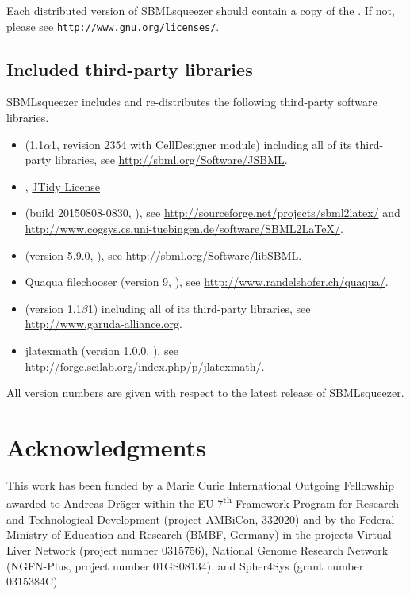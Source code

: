 Each distributed version of SBMLsqueezer should contain a copy of the 
. If not, please see
\href{http://www.gnu.org/licenses/gpl-3.0-standalone.html}{\nolinkurl{http://www.gnu.org/licenses/}}.


\section{Included third-party libraries}
SBMLsqueezer includes and re-distributes the following third-party software libraries.
\begin{itemize}
  \item \JSBML (1.1$\alpha$1, revision 2354 with CellDesigner module) including all of its third-party libraries, see \url{http://sbml.org/Software/JSBML}.
  \item {}, \href{http://jtidy.sourceforge.net/multiproject/jtidyservlet/license.html}{JTidy License}
  \item \SBMLLaTeX (build 20150808-0830, \GPL), see \url{http://sourceforge.net/projects/sbml2latex/} and \url{http://www.cogsys.cs.uni-tuebingen.de/software/SBML2LaTeX/}.
  \item \libSBML (version 5.9.0, \LGPL), see \url{http://sbml.org/Software/libSBML}.
  \item Quaqua filechooser (version 9, \LGPL), see \url{http://www.randelshofer.ch/quaqua/}.
  \item \Garuda (version 1.1$\beta$1) including all of its third-party libraries, see \url{http://www.garuda-alliance.org}.
  \item jlatexmath (version 1.0.0, \GPL), see \url{http://forge.scilab.org/index.php/p/jlatexmath/}.
\end{itemize}
All version numbers are given with respect to the latest release of SBMLsqueezer.

\chapter{Acknowledgments}

This work has been funded by a Marie Curie International Outgoing Fellowship
awarded to Andreas Dr\"ager within the EU 7\textsuperscript{th} Framework
Program for Research and Technological Development (project AMBiCon, 332020) and
by the Federal Ministry of Education and Research (BMBF, Germany) in the
projects Virtual Liver Network (project number 0315756), National Genome
Research Network (NGFN-Plus, project number 01GS08134), and Spher4Sys (grant
number 0315384C).

